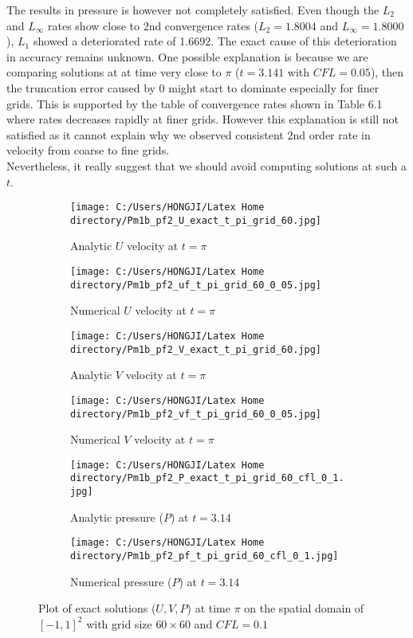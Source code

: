 The results in pressure is however not completely satisfied. Even though the $L_2$ and $L_\infty$ rates show close to 2nd convergence rates ($L_2 = 1.8004$ and $L_\infty = 1.8000$), $L_1$ showed a deteriorated rate of 1.6692. The exact cause of this deterioration in accuracy remains unknown. One possible explanation is because we are comparing solutions at at time very close to $\pi$ ($t = 3.141$ with $CFL = 0.05$), then the truncation error caused by 0 might start to dominate especially for finer grids. This is supported by the table of convergence rates shown in Table 6.1 where rates decreases rapidly at finer grids. However this explanation is still not satisfied as it cannot explain why we observed consistent 2nd order rate in velocity from coarse to fine grids.\\

Nevertheless, it really suggest that we should avoid computing solutions at such a $t$.

\begin{figure}[H]
	\centering
	\begin{subfigure}[t]{2.5in}
		\centering
		\texttt{[image: C:/Users/HONGJI/Latex Home directory/Pm1b\_pf2\_U\_exact\_t\_pi\_grid\_60.jpg]}
		\caption{Analytic $U$ velocity at $t=\pi$}\label{fig:6.1a}		
	\end{subfigure}
	\quad
	\begin{subfigure}[t]{2.5in}
		\centering
		\texttt{[image: C:/Users/HONGJI/Latex Home directory/Pm1b\_pf2\_uf\_t\_pi\_grid\_60\_0\_05.jpg]}
		\caption{Numerical $U$ velocity at $t=\pi$}\label{fig:6.1b}
	\end{subfigure}
	\quad
	\begin{subfigure}[t]{2.5in}
		\centering
		\texttt{[image: C:/Users/HONGJI/Latex Home directory/Pm1b\_pf2\_V\_exact\_t\_pi\_grid\_60.jpg]}
		\caption{Analytic $V$ velocity at $t=\pi$}\label{fig:6.1b}
	\end{subfigure}
	\quad
	\begin{subfigure}[t]{2.5in}
		\centering
		\texttt{[image: C:/Users/HONGJI/Latex Home directory/Pm1b\_pf2\_vf\_t\_pi\_grid\_60\_0\_05.jpg]}
		\caption{Numerical $V$ velocity at $t=\pi$}\label{fig:6.1b}
	\end{subfigure}
	\quad	
	\begin{subfigure}[t]{2.5in}
		\centering
		\texttt{[image: C:/Users/HONGJI/Latex Home directory/Pm1b\_pf2\_P\_exact\_t\_pi\_grid\_60\_cfl\_0\_1.jpg]}
		\caption{Analytic pressure ($P$) at $t=3.14$}\label{fig:6.1b}
	\end{subfigure}
	\quad	
	\begin{subfigure}[t]{2.5in}
		\centering
		\texttt{[image: C:/Users/HONGJI/Latex Home directory/Pm1b\_pf2\_pf\_t\_pi\_grid\_60\_cfl\_0\_1.jpg]}
		\caption{Numerical pressure ($P$) at $t=3.14$}\label{fig:6.1b}
	\end{subfigure}
	\caption{Plot of exact solutions ($U,V,P$) at time $\pi$ on the spatial domain of $[-1,1]^2$ with grid size $60 \times 60$ and $CFL=0.1$}\label{fig:6.1}
\end{figure}


